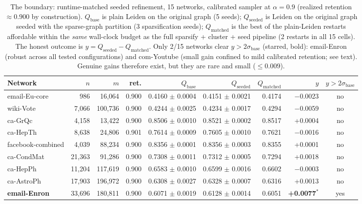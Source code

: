 \begin{table}[t]
\centering
\setlength{\tabcolsep}{5pt}
\caption{The boundary: runtime-matched seeded refinement, 15 networks, calibrated sampler at
$\alpha=0.9$ (realized retention $\approx 0.900$ by construction). $Q_{\mathrm{base}}$ is plain
Leiden on the original graph (5 seeds); $Q_{\mathrm{seeded}}$ is Leiden on the original graph seeded
with the sparse-graph partition (3 sparsification seeds); $Q_{\mathrm{matched}}$ is the best of the
plain-Leiden restarts affordable within the \emph{same} wall-clock budget as the full sparsify +
cluster + seed pipeline (2 restarts in all 15 cells). The honest outcome is
$y = Q_{\mathrm{seeded}} - Q_{\mathrm{matched}}$. Only 2/15 networks clear $y > 2\sigma_{\mathrm{base}}$
(starred, bold): email-Enron (robust across all tested configurations) and com-Youtube (small gain confined to mild calibrated retention; see text). Genuine gains therefore exist, but they are rare and
small ($\le 0.009$).}
\label{tab:boundary}
\footnotesize
\begin{tabular}{lrrrrrrrc}
\toprule
Network & $n$ & $m$ & ret. & $Q_{\mathrm{base}}$ & $Q_{\mathrm{seeded}}$ & $Q_{\mathrm{matched}}$
 & $y$ & $y>2\sigma_{\mathrm{base}}$ \\
\midrule
email-Eu-core & 986 & 16,064 & 0.900 & 0.4160 $\pm$ 0.0004 & 0.4151 $\pm$ 0.0021 & 0.4174 & $-$0.0023 & no \\
wiki-Vote & 7,066 & 100,736 & 0.900 & 0.4244 $\pm$ 0.0025 & 0.4234 $\pm$ 0.0017 & 0.4294 & $-$0.0059 & no \\
ca-GrQc & 4,158 & 13,422 & 0.900 & 0.8506 $\pm$ 0.0010 & 0.8521 $\pm$ 0.0002 & 0.8517 & +0.0004 & no \\
ca-HepTh & 8,638 & 24,806 & 0.901 & 0.7614 $\pm$ 0.0009 & 0.7605 $\pm$ 0.0010 & 0.7621 & $-$0.0016 & no \\
facebook-combined & 4,039 & 88,234 & 0.900 & 0.8356 $\pm$ 0.0001 & 0.8356 $\pm$ 0.0003 & 0.8355 & +0.0001 & no \\
ca-CondMat & 21,363 & 91,286 & 0.900 & 0.7308 $\pm$ 0.0011 & 0.7312 $\pm$ 0.0005 & 0.7294 & +0.0018 & no \\
ca-HepPh & 11,204 & 117,619 & 0.900 & 0.6583 $\pm$ 0.0010 & 0.6599 $\pm$ 0.0016 & 0.6602 & $-$0.0003 & no \\
ca-AstroPh & 17,903 & 196,972 & 0.900 & 0.6308 $\pm$ 0.0027 & 0.6328 $\pm$ 0.0007 & 0.6316 & +0.0013 & no \\
\textbf{email-Enron} & 33,696 & 180,811 & 0.900 & 0.6071 $\pm$ 0.0019 & 0.6128 $\pm$ 0.0014 & 0.6051 & \textbf{+0.0077}$^{\ast}$ & yes \\

\end{tabular}
\end{table}

